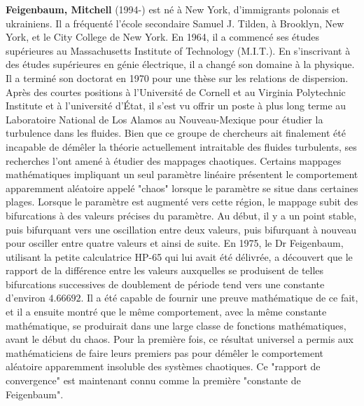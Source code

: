 \textbf{Feigenbaum, Mitchell} (1994-) est né à New York, d'immigrants polonais et ukrainiens. Il a fréquenté l'école secondaire Samuel J. Tilden, à Brooklyn, New York, et le City College de New York. En 1964, il a commencé ses études supérieures au Massachusetts Institute of Technology (M.I.T.). En s'inscrivant à des études supérieures en génie électrique, il a changé son domaine à la physique. Il a terminé son doctorat en 1970 pour une thèse sur les relations de dispersion. Après des courtes positions à l'Université de Cornell et au Virginia Polytechnic Institute et à l'université d'État, il s'est vu offrir un poste à plus long terme au Laboratoire National de Los Alamos au Nouveau-Mexique pour étudier la turbulence dans les fluides. Bien que ce groupe de chercheurs ait finalement été incapable de démêler la théorie actuellement intraitable des fluides turbulents, ses recherches l'ont amené à étudier des mappages chaotiques. Certains mappages mathématiques impliquant un seul paramètre linéaire présentent le comportement apparemment aléatoire appelé "chaos" lorsque le paramètre se situe dans certaines plages. Lorsque le paramètre est augmenté vers cette région, le mappage subit des bifurcations à des valeurs précises du paramètre. Au début, il y a un point stable, puis bifurquant vers une oscillation entre deux valeurs, puis bifurquant à nouveau pour osciller entre quatre valeurs et ainsi de suite. En 1975, le Dr Feigenbaum, utilisant la petite calculatrice HP-65 qui lui avait été délivrée, a découvert que le rapport de la différence entre les valeurs auxquelles se produisent de telles bifurcations successives de doublement de période tend vers une constante d'environ $4.66692$. Il a été capable de fournir une preuve mathématique de ce fait, et il a ensuite montré que le même comportement, avec la même constante mathématique, se produirait dans une large classe de fonctions mathématiques, avant le début du chaos. Pour la première fois, ce résultat universel a permis aux mathématiciens de faire leurs premiers pas pour démêler le comportement aléatoire apparemment insoluble des systèmes chaotiques. Ce "rapport de convergence" est maintenant connu comme la première "constante de Feigenbaum".

